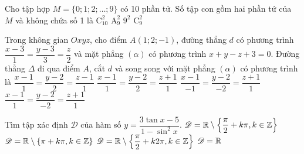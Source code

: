 \begin{ex}%
	Cho tập hợp $M=\{0;1;2;\ldots;9\}$ có 10 phần tử. Số tập con gồm hai phần tử của $M$ và không chứa số 1 là
	\choice 
	{$\mathrm{C}_{10}^2$}
	{$\mathrm{A}_{9}^2$}
	{$9^2$}
	{\True $\mathrm{C}_{9}^2$}
\end{ex}

\begin{ex}%
	Trong không gian $Oxyz$, cho điểm $A(1;2;-1)$, đường thẳng $d$ có phương trình $\dfrac{x-3}{1}=\dfrac{y-3}{3}=\dfrac{z}{2}$ và mặt phẳng $(\alpha)$ có phương trình $x+y-z+3=0$. Đường thẳng $\Delta$ đi qua điểm $A$, cắt $d$ và song song với mặt phẳng $(\alpha)$ có phương trình là
	\choice 
	{$\dfrac{x-1}{1}=\dfrac{y-2}{2}=\dfrac{z-1}{1}$}
	{$\dfrac{x-1}{1}=\dfrac{y-2}{2}=\dfrac{z+1}{1}$}
	{$\dfrac{x-1}{-1}=\dfrac{y-2}{-2}=\dfrac{z+1}{1}$}
	{\True $\dfrac{x-1}{1}=\dfrac{y-2}{-2}=\dfrac{z+1}{1}$}
\end{ex}

\begin{ex}%
	Tìm tập xác định $\mathscr D $ của hàm số $y=\dfrac{3\tan x - 5}{1-\sin^2 x}$.
	\choice
	{\True $\mathscr D =\mathbb{R} \setminus \left\{\dfrac{\pi}{2}+k\pi,k\in \Bbb Z\right\}$}
	{ $\mathscr D =\mathbb{R} \setminus \left\{\pi+k\pi,k\in \Bbb Z\right\}$}
	{ $\mathscr D =\mathbb{R} \setminus \left\{\dfrac{\pi}{2}+k2\pi,k\in \Bbb Z\right\}$}
	{ $\mathscr D =\Bbb R$}
\end{ex}

